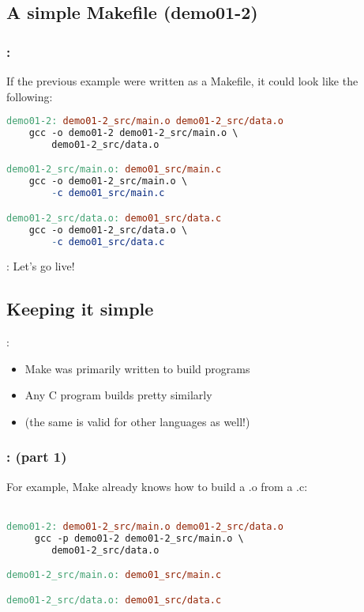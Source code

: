 \subsection{A simple Makefile (demo01-2)}
\begin{frame}[fragile]
    \frametitle{\secname: \small\subsecname\normalsize}

    If the previous example were written as a Makefile, it could look like the following:

    \small \begin{lstlisting}[language=make]
demo01-2: demo01-2_src/main.o demo01-2_src/data.o
    gcc -o demo01-2 demo01-2_src/main.o \
        demo01-2_src/data.o

demo01-2_src/main.o: demo01_src/main.c
    gcc -o demo01-2_src/main.o \
        -c demo01_src/main.c

demo01-2_src/data.o: demo01_src/data.c
    gcc -o demo01-2_src/data.o \
        -c demo01_src/data.c
    \end{lstlisting} \normalsize
\end{frame}

\begin{frame}{\secname: \small\subsecname\normalsize}
    Let's go live!

\end{frame}

\subsection{Keeping it simple}
\begin{frame}{\secname: \small\subsecname\normalsize}
    \begin{itemize}
        \item Make was primarily written to build programs
        \item Any C program builds pretty similarly
        \item (the same is valid for other languages as well!)
    \end{itemize}
\end{frame}

\begin{frame}[fragile]
    \frametitle{\secname: \small\subsecname (part 1)\normalsize}

    For example, Make already knows how to build a .o from a .c: \\~\\

    \small \begin{lstlisting}[language=make]
demo01-2: demo01-2_src/main.o demo01-2_src/data.o
     gcc -p demo01-2 demo01-2_src/main.o \
        demo01-2_src/data.o

demo01-2_src/main.o: demo01_src/main.c

demo01-2_src/data.o: demo01_src/data.c
    \end{lstlisting} \normalsize
\end{frame}

